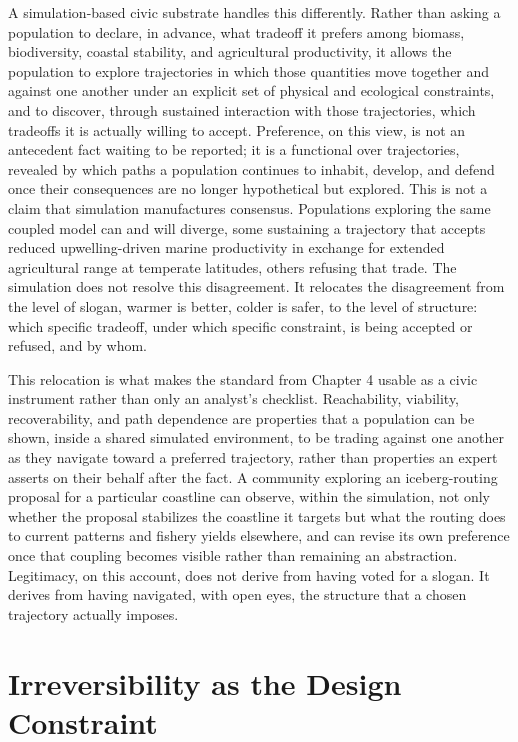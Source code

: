 \documentclass[11pt,oneside]{book}
\begin{document}
A simulation-based civic substrate handles this differently. Rather than asking a population to declare, in advance, what tradeoff it prefers among biomass, biodiversity, coastal stability, and agricultural productivity, it allows the population to explore trajectories in which those quantities move together and against one another under an explicit set of physical and ecological constraints, and to discover, through sustained interaction with those trajectories, which tradeoffs it is actually willing to accept. Preference, on this view, is not an antecedent fact waiting to be reported; it is a functional over trajectories, revealed by which paths a population continues to inhabit, develop, and defend once their consequences are no longer hypothetical but explored. This is not a claim that simulation manufactures consensus. Populations exploring the same coupled model can and will diverge, some sustaining a trajectory that accepts reduced upwelling-driven marine productivity in exchange for extended agricultural range at temperate latitudes, others refusing that trade. The simulation does not resolve this disagreement. It relocates the disagreement from the level of slogan, warmer is better, colder is safer, to the level of structure: which specific tradeoff, under which specific constraint, is being accepted or refused, and by whom.

This relocation is what makes the standard from Chapter 4 usable as a civic instrument rather than only an analyst's checklist. Reachability, viability, recoverability, and path dependence are properties that a population can be shown, inside a shared simulated environment, to be trading against one another as they navigate toward a preferred trajectory, rather than properties an expert asserts on their behalf after the fact. A community exploring an iceberg-routing proposal for a particular coastline can observe, within the simulation, not only whether the proposal stabilizes the coastline it targets but what the routing does to current patterns and fishery yields elsewhere, and can revise its own preference once that coupling becomes visible rather than remaining an abstraction. Legitimacy, on this account, does not derive from having voted for a slogan. It derives from having navigated, with open eyes, the structure that a chosen trajectory actually imposes.

\section*{Irreversibility as the Design Constraint}
\end{document}
